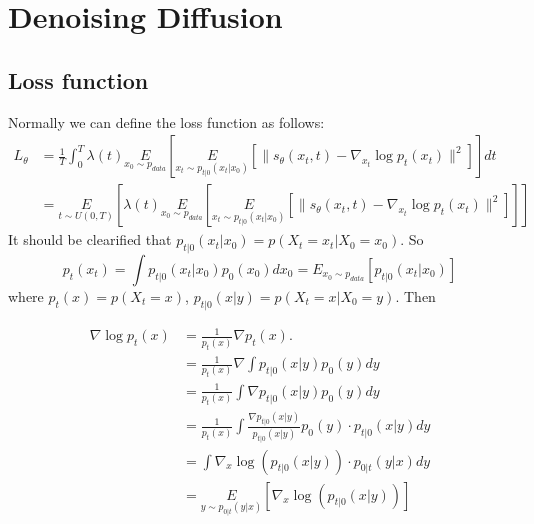 \documentclass{article}
\begin{document}
\section{Denoising Diffusion}
\subsection{Loss function}
Normally we can define the loss function as follows:
\begin{equation}
    \begin{aligned}
        L_\theta & = \frac{1}{T}\int_0^T\lambda(t)\underset{x_0\sim p_{data}}{E}\left[\underset{x_t\sim p_{t|0}(x_t|x_0)}{E}\left[\|s_\theta(x_t, t)-\nabla_{x_t}\log p_t(x_t)\|^2\right]\right]dt\\
        &=\underset{t\sim U(0, T)}{E}\left[\lambda(t)\underset{x_0\sim p_{data}}{E}\left[\underset{x_t\sim p_{t|0}(x_t|x_0)}{E}\left[\|s_\theta(x_t, t)-\nabla_{x_t}\log p_t(x_t)\|^2\right]\right]\right]
    \end{aligned}
\end{equation}
It should be clearified that $p_{t|0}(x_t|x_0)=p(X_t=x_t|X_0=x_0)$. So $$p_t(x_t)=\int p_{t|0}(x_t|x_0)p_0(x_0)dx_0=E_{x_0\sim p_{data}}\left[p_{t|0}(x_t|x_0)\right]$$
where $p_{t}(x)=p\left(X_{t}=x\right)$, $p_{t | 0}(x | y)=p\left(X_{t}=x | X_{0}=y\right)$. Then

\begin{equation}
    \begin{aligned}
    \nabla \log p_{t}(x) & =\frac{1}{p_{t}(x)} \nabla p_{t}(x) . \\
    & =\frac{1}{p_{t}(x)} \nabla \int p_{t | 0}(x | y) p_{0}(y) d y \\
    & =\frac{1}{p_{t}(x)} \int \nabla p_{t | 0}(x | y) p_{0}(y) d y \\
    & =\frac{1}{p_{t}(x)} \int \frac{\nabla p_{t | 0}(x | y)}{p_{t | 0}(x | y)} p_{0}(y) \cdot p_{t | 0}(x | y) d y \\
    & =\int \nabla_{x} \log \left(p_{t | 0}(x | y)\right) \cdot p_{0 | t}(y | x) d y \\
    & =\underset{y\sim p_{0|t}(y|x)}{E}\left[\nabla_{x} \log \left(p_{t | 0}(x | y)\right)\right]
    \end{aligned}
\end{equation}
\end{document}
